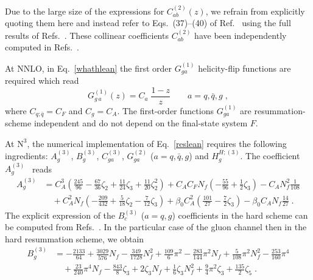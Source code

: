 \documentclass[12pt]{article}
\DeclareRobustCommand{\nn}{\nonumber}
\DeclareRobustCommand{\LO}{\text{LO}\xspace}
\DeclareRobustCommand{\N}[1]{\ensuremath{\text{N}^{#1}}} %
\begin{document}
\begin{appendix}
Due to the large size of the expressions for $C_{ab}^{(2)}(z)$, we refrain from explicitly quoting them here and instead refer to Eqs.~(37)--(40) of Ref.~\cite{Catani:2013tia} using the full results of Refs.~\cite{Catani:2011kr,Catani:2012qa}. These collinear coefficients $C^{(2)}_{ab}$ have been independently computed in Refs.~\cite{Gehrmann:2012ze,Echevarria:2016scs}.

At NNLO, in Eq.~\eqref{whathlean} the first order $G_{ga}^{(1)}$ helicity-flip functions are required which read~\cite{Catani:2010pd}
\begin{equation}
  G_{g \,a}^{(1)}(z) = C_a \;\frac{1-z}{z} \qquad a=q,\bar{q},g \; ,
\end{equation}
where $C_{q;\bar{q}}=C_{F}$ and $C_g=C_{A}$. The first-order functions $G_{ga}^{(1)}$ are resummation-scheme independent and do not depend on the final-state system $F$.

At \N3\LO, the numerical implementation of Eq.~\eqref{reslean} requires the following ingredients: $A^{(3)}_{g}$, $B^{(3)}_{g}$, $C^{(3)}_{ga}$, $G^{(2)}_{ga}$ ($a=q,{\bar q},g$) and $H^{H;(3)}_{g}$. The coefficient $A_g^{(3)}$~\cite{Becher:2010tm} reads
\begin{align}
  A_g^{(3)} &=  
  C_A^3 \left( 
    \frac{245}{96} 
    - \frac{67}{36}\zeta_2
    + \frac{11}{24}\zeta_3 + \frac{11}{20}\zeta_2^2\right) 
    + C_A C_F N_f \left(-\frac{55}{96} 
    + \frac{1}{2}\zeta_3
  \right)
  -C_A N_f^2 \frac{1}{108} 
  \nn\\&\quad
  + C_A^2 N_f \left(
    - \frac{209}{432} 
    + \frac{5}{18}\zeta_2 
    - \frac{7}{12} \zeta_3
  \right)  
  + \beta_{0} C_A^2 \left(
    \frac{101}{27}
    -\frac{7}{2}\zeta_{3}
  \right)
  -\beta_{0} C_A N_f \frac{14}{27} \;.
  \label{acoeff}
\end{align}
The explicit expression of the $B_c^{(3)}$ ($a=q,g$) coefficients in the hard scheme can be computed from Refs.~\cite{Li:2016ctv,Vladimirov:2016dll}. In the particular case of the gluon channel then in the hard resummation scheme, we obtain
\begin{align}
  B_g^{(3)} &= 
  - \frac{2133}{64} 
  + \frac{3029}{576} N_{f} 
  - \frac{349}{1728} N_{f}^{2}  
  + \frac{109}{6} \pi^{2} 
  - \frac{283}{144} \pi^{2}  N_{f} 
  + \frac{5}{108} \pi^{2}  N_{f}^{2}
  -\frac{253}{160} \pi^{4}
  \nn\\&\quad
  +\frac{23}{240} \pi^{4} N_{f}
  -\frac{843}{8} \zeta_{3} 
  + 2 \zeta_{3} N_{f} 
  + \frac{1}{6} \zeta_{3} N_{f}^{2} 
  + \frac{9}{4} \pi^{2}  \zeta_{3} 
  + \frac{135}{2}  \zeta_{5} \;.
\end{align}



\end{appendix}
\end{document}
